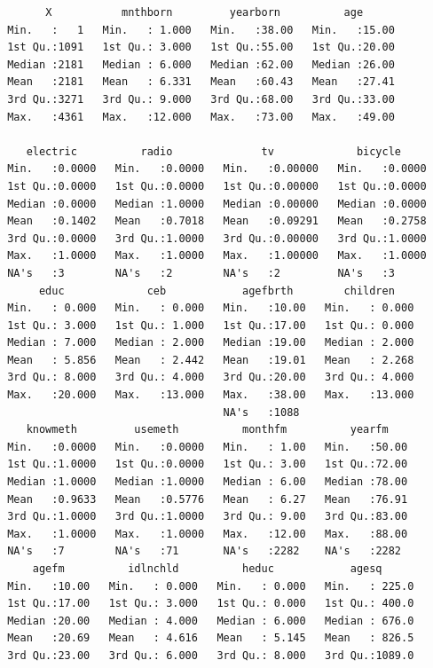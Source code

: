 \documentclass[
  letterpaper,
  DIV=11,
  numbers=noendperiod]{scrartcl}
\begin{document}
\begin{verbatim}
       X           mnthborn         yearborn          age       
 Min.   :   1   Min.   : 1.000   Min.   :38.00   Min.   :15.00  
 1st Qu.:1091   1st Qu.: 3.000   1st Qu.:55.00   1st Qu.:20.00  
 Median :2181   Median : 6.000   Median :62.00   Median :26.00  
 Mean   :2181   Mean   : 6.331   Mean   :60.43   Mean   :27.41  
 3rd Qu.:3271   3rd Qu.: 9.000   3rd Qu.:68.00   3rd Qu.:33.00  
 Max.   :4361   Max.   :12.000   Max.   :73.00   Max.   :49.00  
                                                                
    electric          radio              tv             bicycle      
 Min.   :0.0000   Min.   :0.0000   Min.   :0.00000   Min.   :0.0000  
 1st Qu.:0.0000   1st Qu.:0.0000   1st Qu.:0.00000   1st Qu.:0.0000  
 Median :0.0000   Median :1.0000   Median :0.00000   Median :0.0000  
 Mean   :0.1402   Mean   :0.7018   Mean   :0.09291   Mean   :0.2758  
 3rd Qu.:0.0000   3rd Qu.:1.0000   3rd Qu.:0.00000   3rd Qu.:1.0000  
 Max.   :1.0000   Max.   :1.0000   Max.   :1.00000   Max.   :1.0000  
 NA's   :3        NA's   :2        NA's   :2         NA's   :3       
      educ             ceb            agefbrth        children     
 Min.   : 0.000   Min.   : 0.000   Min.   :10.00   Min.   : 0.000  
 1st Qu.: 3.000   1st Qu.: 1.000   1st Qu.:17.00   1st Qu.: 0.000  
 Median : 7.000   Median : 2.000   Median :19.00   Median : 2.000  
 Mean   : 5.856   Mean   : 2.442   Mean   :19.01   Mean   : 2.268  
 3rd Qu.: 8.000   3rd Qu.: 4.000   3rd Qu.:20.00   3rd Qu.: 4.000  
 Max.   :20.000   Max.   :13.000   Max.   :38.00   Max.   :13.000  
                                   NA's   :1088                    
    knowmeth         usemeth          monthfm          yearfm     
 Min.   :0.0000   Min.   :0.0000   Min.   : 1.00   Min.   :50.00  
 1st Qu.:1.0000   1st Qu.:0.0000   1st Qu.: 3.00   1st Qu.:72.00  
 Median :1.0000   Median :1.0000   Median : 6.00   Median :78.00  
 Mean   :0.9633   Mean   :0.5776   Mean   : 6.27   Mean   :76.91  
 3rd Qu.:1.0000   3rd Qu.:1.0000   3rd Qu.: 9.00   3rd Qu.:83.00  
 Max.   :1.0000   Max.   :1.0000   Max.   :12.00   Max.   :88.00  
 NA's   :7        NA's   :71       NA's   :2282    NA's   :2282   
     agefm          idlnchld          heduc            agesq       
 Min.   :10.00   Min.   : 0.000   Min.   : 0.000   Min.   : 225.0  
 1st Qu.:17.00   1st Qu.: 3.000   1st Qu.: 0.000   1st Qu.: 400.0  
 Median :20.00   Median : 4.000   Median : 6.000   Median : 676.0  
 Mean   :20.69   Mean   : 4.616   Mean   : 5.145   Mean   : 826.5  
 3rd Qu.:23.00   3rd Qu.: 6.000   3rd Qu.: 8.000   3rd Qu.:1089.0  

\end{verbatim}
\end{document}
